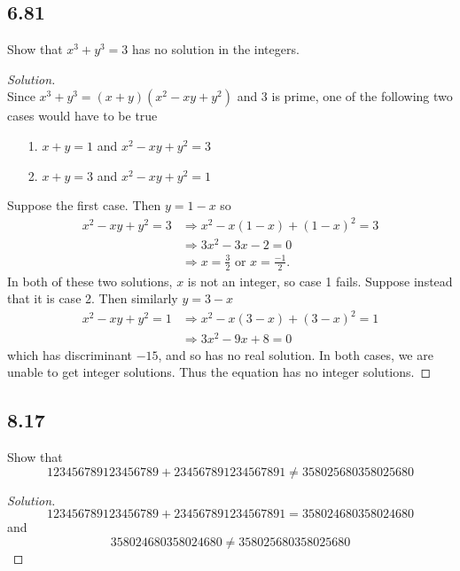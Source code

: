 \documentclass[]{article}
\newcommand\<{\langle}
\renewcommand\>{\rangle}
\newenvironment{solution}
{
	\begin{proof}[Solution] \text{ }
		\\
	}
	{
	\end{proof}
}
\begin{document}
\subsection*{6.81} Show that $x^3 + y^3 = 3$ has no solution in the integers.
\begin{solution}
	Since $x^3 + y^3 = (x + y)(x^2 - xy + y^2)$ and 3 is prime, one of the following two cases would have to be true
	\begin{enumerate}
		\item[1.] $x + y = 1$ and $x^2 - xy + y^2 = 3$
		\item[2.] $x + y = 3$ and $x^2 - xy + y^2 = 1$
	\end{enumerate}
	Suppose the first case. Then $y = 1 - x$ so
	\begin{align*}
		x^2 - xy + y^2 = 3 &\Rightarrow x^2 - x(1 - x) + (1 - x)^2 = 3 \\
		&\Rightarrow 3x^2 - 3x - 2 = 0 \\
		&\Rightarrow x = \frac{3}{2} \text{ or } x = \frac{-1}{2}.
	\end{align*}
	In both of these two solutions, $x$ is not an integer, so case 1 fails. Suppose instead that it is case 2. Then similarly $y = 3 - x$
	\begin{align*}
		x^2 - xy + y^2 = 1 &\Rightarrow x^2 - x(3 - x) + (3 - x)^2 = 1 \\
		&\Rightarrow 3x^2 - 9x + 8 = 0
	\end{align*}
	which has discriminant $-15$, and so has no real solution. In both cases, we are unable to get integer solutions. Thus the equation has no integer solutions.
	
\end{solution}

\subsection*{8.17} Show that
$$
	123456789123456789 + 234567891234567891 \neq 358025680358025680
$$
\begin{solution}
	$$
		123456789123456789 + 234567891234567891 = 358024680358024680
	$$
	and 
	$$
		358024680358024680 \neq 358025680358025680
	$$
\end{solution}
\end{document}

